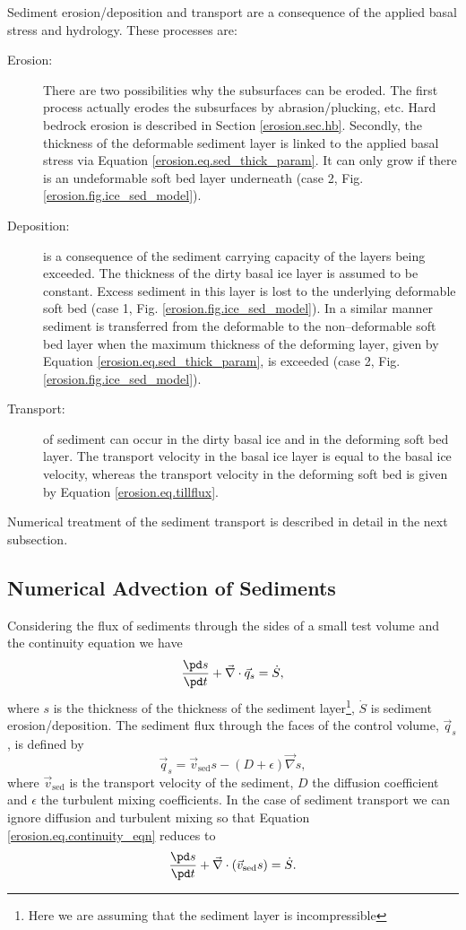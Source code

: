 Sediment erosion/deposition and transport are a consequence of the applied basal stress and hydrology. These processes are:
\begin{description}
\item[Erosion:] There are two possibilities why the subsurfaces can be eroded. The first process actually erodes the subsurfaces by abrasion/plucking, etc. Hard bedrock erosion is described in Section \ref{erosion.sec.hb}. Secondly, the thickness of the deformable sediment layer is linked to the applied basal stress via Equation \eqref{erosion.eq.sed_thick_param}. It can only grow if there is an undeformable soft bed layer underneath (case 2, Fig. \ref{erosion.fig.ice_sed_model}).
\item[Deposition:] is a consequence of the sediment carrying capacity of the layers being exceeded. The thickness of the dirty basal ice layer is assumed to be
constant. Excess sediment in this layer is lost to the underlying deformable soft bed (case 1, Fig. \ref{erosion.fig.ice_sed_model}). In a similar manner sediment is transferred from the deformable to the non--deformable soft bed layer when the maximum thickness of the deforming layer, given by Equation \eqref{erosion.eq.sed_thick_param}, is exceeded (case 2, Fig.\ref{erosion.fig.ice_sed_model}).
\item[Transport:] of sediment can occur in the dirty basal ice and in the deforming soft bed layer. The transport velocity in the basal ice layer is equal to the basal ice velocity, whereas the transport velocity in the deforming soft bed is given by Equation \eqref{erosion.eq.tillflux}.
\end{description}
Numerical treatment of the sediment transport is described in detail in the next subsection.

\subsection{Numerical Advection of Sediments}
Considering the flux of sediments through the sides of a small test volume and the continuity equation we have
\begin{equation}
  \label{erosion.eq.continuity_eqn}
  \frac{\pd s}{\pd t}+\vec\nabla\cdot\vec{q}_s=\dot{S},
\end{equation}
where $s$ is the thickness of the thickness of the sediment layer\footnote{Here we are assuming that the sediment layer is incompressible}, $\dot{S}$ is sediment erosion/deposition. The sediment flux through the faces of the control volume, $\vec{q}_s$, is defined by
\begin{equation}
  \vec{q}_s=\vec{v}_{\text{sed}}s-(D+\epsilon)\vec\nabla s,
\end{equation}
where $\vec{v}_{\text{sed}}$ is the transport velocity of the sediment, $D$ the diffusion coefficient and $\epsilon$ the turbulent mixing coefficients. In the case of sediment transport we can ignore diffusion and turbulent mixing so that Equation \eqref{erosion.eq.continuity_eqn} reduces to
\begin{equation}
  \label{erosion.eq.transport_eqn}
  \frac{\pd s}{\pd t}+\vec\nabla\cdot(\vec{v}_{\text{sed}}s)=\dot{S}.
\end{equation}

